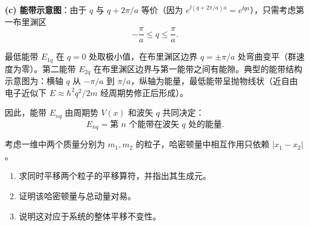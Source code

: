 \begin{solution}
	\textbf{(c) 能带示意图}：由于 $q$ 与 $q+2\pi/a$ 等价（因为 $e^{\ii (q+2\pi/a)a}=e^{\ii qa}$），只需考虑第一布里渊区
	\[
	-\frac{\pi}{a}\le q\le\frac{\pi}{a}.
	\]

	最低能带 $E_{1q}$ 在 $q=0$ 处取极小值，在布里渊区边界 $q=\pm\pi/a$ 处弯曲变平（群速度为零）。第二能带 $E_{2q}$ 在布里渊区边界与第一能带之间有能隙。典型的能带结构示意图为：横轴 $q$ 从 $-\pi/a$ 到 $\pi/a$，纵轴为能量，最低能带呈抛物线状（近自由电子近似下 $E\approx\hbar^2q^2/2m$ 经周期势修正后形成）。

	因此，能带 $E_{nq}$ 由周期势 $V(x)$ 和波矢 $q$ 共同决定：
	\[
	\boxed{E_{nq}=\text{第 }n\text{ 个能带在波矢 }q\text{ 处的能量}}.
	\]
	\end{solution}

\begin{question}
考虑一维中两个质量分别为 $m_1,m_2$ 的粒子，哈密顿量中相互作用只依赖 $|x_1-x_2|$。
\begin{enumerate}
\item 求同时平移两个粒子的平移算符，并指出其生成元。
\item 证明该哈密顿量与总动量对易。
\item 说明这对应于系统的整体平移不变性。
\end{enumerate}
\end{question}
